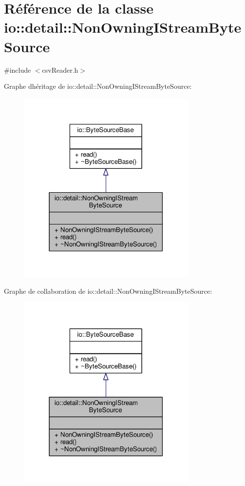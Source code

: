 \hypertarget{classio_1_1detail_1_1NonOwningIStreamByteSource}{}\section{Référence de la classe io\+:\+:detail\+:\+:Non\+Owning\+I\+Stream\+Byte\+Source}
\label{classio_1_1detail_1_1NonOwningIStreamByteSource}


{\ttfamily \#include $<$csv\+Reader.\+h$>$}



Graphe d\textquotesingle{}héritage de io\+:\+:detail\+:\+:Non\+Owning\+I\+Stream\+Byte\+Source\+:\nopagebreak
\begin{figure}[H]
\begin{center}
\leavevmode
\includegraphics[width=254pt]{classio_1_1detail_1_1NonOwningIStreamByteSource__inherit__graph}
\end{center}
\end{figure}


Graphe de collaboration de io\+:\+:detail\+:\+:Non\+Owning\+I\+Stream\+Byte\+Source\+:\nopagebreak
\begin{figure}[H]
\begin{center}
\leavevmode
\includegraphics[width=254pt]{classio_1_1detail_1_1NonOwningIStreamByteSource__coll__graph}
\end{center}
\end{figure}

